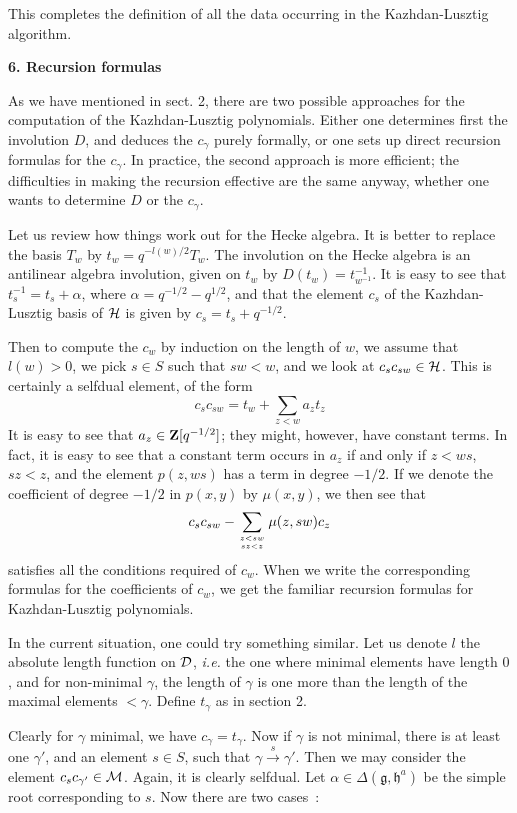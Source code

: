 \documentclass[11 pt]{article}
\def\ra{\rightarrow}
\def\rao#1{\overset{#1}\ra}
\def\1{^{-1}}
\def\a{\alpha}
\def\D{{\cal D}}
\def\g{\gamma}
\def\gf{{\mathfrak g}}
\def\Hc{{\cal H}}
\def\hf{{\mathfrak h}}
\def\M{{\cal M}}
\def\qmh{q^{-1/2}}
\def\Z{{\bf Z}}
\begin{document}
\medskip

This completes the definition of all the data occurring in the Kazhdan-Lusztig
algorithm.

\bigskip

\noindent\textbf{6. Recursion formulas}

\medskip

As we have mentioned in sect. 2, there are two possible approaches for the
computation of the Kazhdan-Lusztig polynomials. Either one determines first
the involution $D$, and deduces the $c_\g$ purely formally, or one sets up
direct recursion formulas for the $c_\g$. In practice, the second approach
is more efficient; the difficulties in making the recursion effective are the
same anyway, whether one wants to determine $D$ or the $c_\g$.

\medskip

Let us review how things work out for the Hecke algebra. It is better to
replace the basis $T_w$ by $t_w=q^{-l(w)/2}T_w$. The involution on the
Hecke algebra is an antilinear algebra involution, given on $t_w$ by
$D(t_w)=t_{w\1}\1$. It is easy to see that $t_s\1=t_s+\a$, where
$\a=q^{-1/2}-q^{1/2}$, and that the element $c_s$ of the Kazhdan-Lusztig
basis of $\Hc$ is given by $c_s=t_s+\qmh$.

Then to compute the $c_w$ by induction on the length of $w$, we assume
that $l(w)>0$, we pick $s\in S$ such that $sw<w$, and we look at
$c_sc_{sw}\in\Hc$. This is certainly a selfdual element, of the form
$$
c_sc_{sw}=t_w+\sum_{z<w}a_zt_z
$$
It is easy to see that $a_z\in\Z[\qmh]$; they might, however, have constant
terms. In fact, it is easy to see that a constant term occurs in $a_z$ if
and only if $z<ws$, $sz<z$, and the element $p(z,ws)$ has a term in degree
$-1/2$. If we denote the coefficient of degree $-1/2$ in $p(x,y)$ by
$\mu(x,y)$, we then see that
$$
c_sc_{sw}-\sum_{z<sw\atop sz<z}\mu(z,sw)c_z
$$
satisfies all the conditions required of $c_w$. When we write the corresponding
formulas for the coefficients of $c_w$, we get the familiar recursion formulas
for Kazhdan-Lusztig polynomials.

\medskip

In the current situation, one could try something similar. Let us denote $l$
the absolute length function on $\D$, {\em i.e.} the one where minimal elements
have length $0$, and for non-minimal $\g$, the length of $\g$ is one more than
the length of the maximal elements $<\g$. Define $t_\g$ as in section 2.

Clearly for $\g$ minimal, we have $c_\g=t_\g$. Now if $\g$ is not minimal,
there is at least one $\g'$, and an element $s\in S$, such that $\g\rao s\g'$.
Then we may consider the element $c_sc_{\g'}\in \M$. Again, it is clearly
selfdual. Let $\a\in\Delta(\gf,\hf^a)$ be the simple root corresponding to
$s$. Now there are two cases~:
\end{document}
